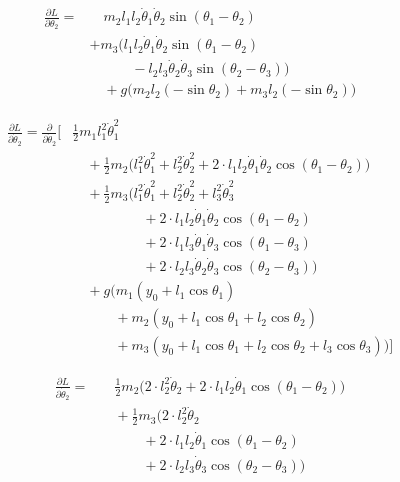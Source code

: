 \documentclass[11pt,a4paper]{article}
\begin{document}
\begin{align*}
    \frac{\partial L}{\partial \theta_2} = 
    &\quad m_2 l_1 l_2 \dot{\theta}_1 \dot{\theta}_2 \sin(\theta_1 - \theta_2) \\
    &+ m_3 \Big(l_1 l_2 \dot{\theta}_1 \dot{\theta}_2 \sin(\theta_1 - \theta_2) \\
        &\qquad\quad - l_2 l_3 \dot{\theta}_2 \dot{\theta}_3 \sin(\theta_2 - \theta_3) \Big) \\
    &\quad + g \Big( m_2 l_2 (-\sin\theta_2) + m_3 l_2 (-\sin\theta_2) \Big) 
\end{align*}


\begin{align*}
    \frac{\partial L}{\partial \dot\theta_2} = \frac{\partial}{\partial \dot\theta_2} \Biggl[
    &\frac{1}{2} m_1 l_1^2 \dot{\theta}_1^2 \\
    &\quad + \frac{1}{2} m_2 \big( l_1^2 \dot{\theta}_1^2 + l_2^2 \dot{\theta}_2^2 + 2 \cdot l_1 l_2 \dot{\theta}_1 \dot{\theta}_2 \cos(\theta_1 - \theta_2) \big) \\
    &\quad + \frac{1}{2} m_3 \big( l_1^2 \dot{\theta}_1^2 + l_2^2 \dot{\theta}_2^2 + l_3^2 \dot{\theta}_3^2 \\
        &\qquad\qquad\quad + 2 \cdot l_1 l_2 \dot{\theta}_1 \dot{\theta}_2 \cos(\theta_1 - \theta_2) \\
        &\qquad\qquad\quad + 2 \cdot l_1 l_3 \dot{\theta}_1 \dot{\theta}_3 \cos(\theta_1 - \theta_3) \\
        &\qquad\qquad\quad + 2 \cdot l_2 l_3 \dot{\theta}_2 \dot{\theta}_3 \cos(\theta_2 - \theta_3) \big) \\
    &\quad + g \big( m_1 (y_0 + l_1 \cos\theta_1) \\
        &\qquad\quad + m_2 (y_0 + l_1 \cos\theta_1 + l_2 \cos\theta_2) \\
        &\qquad\quad + m_3 (y_0 + l_1 \cos\theta_1 + l_2 \cos\theta_2 + l_3 \cos\theta_3) \big) \Biggr]
\end{align*}

\begin{align*}
    \frac{\partial L}{\partial \dot\theta_2} =&\quad \frac{1}{2} m_2 \big( 2 \cdot l_2^2 \dot{\theta}_2 + 2 \cdot l_1 l_2 \dot{\theta}_1 \cos(\theta_1 - \theta_2) \big) \\
    &\quad + \frac{1}{2} m_3 \Big( 2 \cdot l_2^2 \dot{\theta}_2 \\
        &\qquad\quad + 2 \cdot l_1 l_2 \dot{\theta}_1 \cos(\theta_1 - \theta_2) \\
        &\qquad\quad + 2 \cdot l_2 l_3 \dot{\theta}_3 \cos(\theta_2 - \theta_3) \Big) \\
\end{align*}
\end{document}
